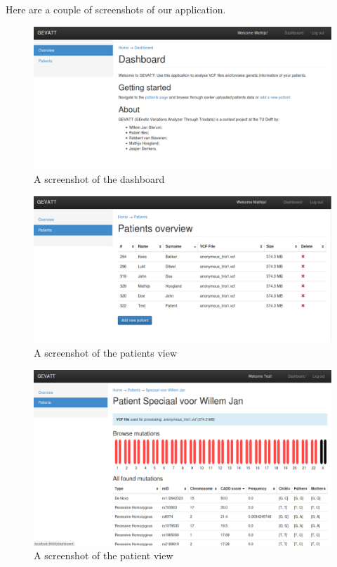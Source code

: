Here are a couple of screenshots of our application.
\begin{figure}[H]
\includegraphics[scale=0.3]{dashboard.png}
\caption{A screenshot of the dashboard}
\label{fig:dashboard}
\end{figure} 
\begin{figure}[H]
\includegraphics[scale=0.3]{patients.png}
\caption{A screenshot of the patients view}
\label{fig:patients}
\end{figure} 
\begin{figure}[H]
\includegraphics[scale=0.3]{patient.png}
\caption{A screenshot of the patient view}
\label{fig:patient}
\end{figure} 
